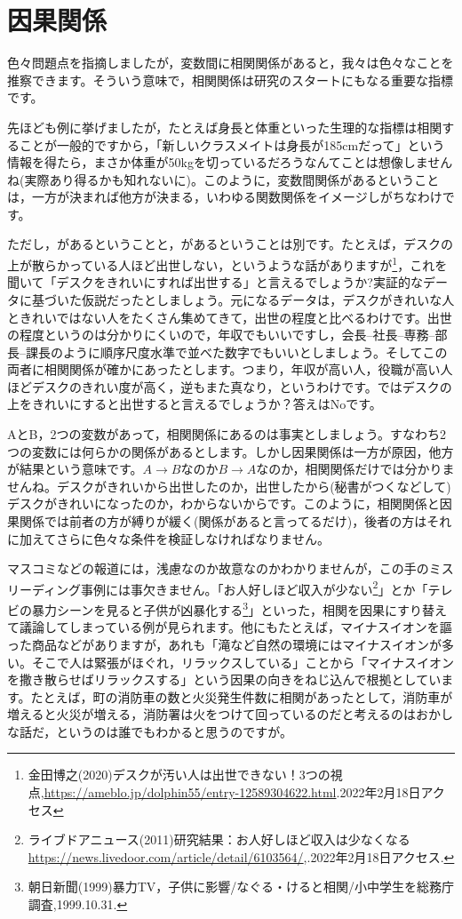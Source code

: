 \documentclass{ltjbook}
\begin{document}
\section{因果関係}

色々問題点を指摘しましたが，変数間に相関関係があると，我々は色々なことを推察できます。そういう意味で，相関関係は研究のスタートにもなる重要な指標です。

先ほども例に挙げましたが，たとえば身長と体重といった生理的な指標は相関することが一般的ですから，「新しいクラスメイトは身長が185cmだって」という情報を得たら，まさか体重が50kgを切っているだろうなんてことは想像しませんね(実際あり得るかも知れないに)。このように，変数間関係があるということは，一方が決まれば他方が決まる，いわゆる関数関係をイメージしがちなわけです。

ただし，があるということと，があるということは別です。たとえば，デスクの上が散らかっている人ほど出世しない，というような話がありますが\footnote{金田博之(2020)デスクが汚い人は出世できない！3つの視点,\url{https://ameblo.jp/dolphin55/entry-12589304622.html}.2022年2月18日アクセス}，これを聞いて「デスクをきれいにすれば出世する」と言えるでしょうか?実証的なデータに基づいた仮説だったとしましょう。元になるデータは，デスクがきれいな人ときれいではない人をたくさん集めてきて，出世の程度と比べるわけです。出世の程度というのは分かりにくいので，年収でもいいですし，会長--社長--専務--部長--課長のように順序尺度水準で並べた数字でもいいとしましょう。そしてこの両者に相関関係が確かにあったとします。つまり，年収が高い人，役職が高い人ほどデスクのきれい度が高く，逆もまた真なり，というわけです。ではデスクの上をきれいにすると出世すると言えるでしょうか？答えはNoです。

AとB，2つの変数があって，相関関係にあるのは事実としましょう。すなわち2つの変数には何らかの関係があるとします。しかし因果関係は一方が原因，他方が結果という意味です。$A \to B$なのか$B \to A$なのか，相関関係だけでは分かりませんね。デスクがきれいから出世したのか，出世したから(秘書がつくなどして)デスクがきれいになったのか，わからないからです。このように，相関関係と因果関係では前者の方が縛りが緩く(関係があると言ってるだけ)，後者の方はそれに加えてさらに色々な条件を検証しなければなりません。

マスコミなどの報道には，浅慮なのか故意なのかわかりませんが，この手のミスリーディング事例には事欠きません。「お人好しほど収入が少ない\footnote{ライブドアニュース(2011)研究結果：お人好しほど収入は少なくなる\url{https://news.livedoor.com/article/detail/6103564/},.2022年2月18日アクセス.}」とか「テレビの暴力シーンを見ると子供が凶暴化する\footnote{朝日新聞(1999)暴力TV，子供に影響/なぐる・けると相関/小中学生を総務庁調査,1999.10.31.}」といった，相関を因果にすり替えて議論してしまっている例が見られます。他にもたとえば，マイナスイオンを謳った商品などがありますが，あれも「滝など自然の環境にはマイナスイオンが多い。そこで人は緊張がほぐれ，リラックスしている」ことから「マイナスイオンを撒き散らせばリラックスする」という因果の向きをねじ込んで根拠としています。たとえば，町の消防車の数と火災発生件数に相関があったとして，消防車が増えると火災が増える，消防署は火をつけて回っているのだと考えるのはおかしな話だ，というのは誰でもわかると思うのですが。
\end{document}
